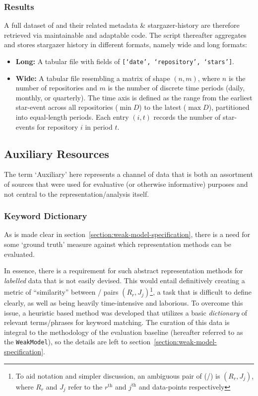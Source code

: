\subsubsection{Results}
A full dataset of \ghrepos{} and their related metadata \& stargazer-history are therefore retrieved via maintainable and adaptable code.
The script thereafter aggregates and stores stargazer history in different formats, namely wide and long formats:
\begin{itemize}
    \item \textbf{Long:} A tabular file with fields of \texttt{[`date', `repository', `stars']}.
    \item \textbf{Wide:} A tabular file resembling a matrix of shape $(n, m)$, where $n$ is the number of repositories and $m$ is the number of discrete time periods (daily, monthly, or quarterly).
          The time axis is defined as the range from the earliest star-event across all repositories ($\min D$) to the latest ($\max D$), partitioned into equal-length periods. Each entry $(i, t)$ records the number of star-events for repository $i$ in period $t$.
\end{itemize}

\subsection{Auxiliary Resources}
The term `Auxiliary' here represents a channel of data that is both an assortment of sources that were used for evaluative (or otherwise informative) purposes and not central to the representation/analysis itself.
\subsubsection{Keyword Dictionary}
As is made clear in section~\ref{section:weak-model-specification}, there is a need for some `ground truth' measure against which representation methods can be evaluated.

In essence, there is a requirement for such abstract representation methods for \emph{labelled} data that is not easily devised.
This would entail definitively creating a metric of ``similarity'' between \jobpost{}/\repo{} pairs $(R_r, J_j)$\footnote{To aid notation and simpler discussion, an ambiguous pair of (\jobpost{}/\repo{}) is $(R_r, J_j)$, where $R_r$ and $J_j$ refer to the $r^{\text{th}}$ and $j^{\text{th}}$ \repo{} and \jobpost{} data-points respectively},
a task that is difficult to define clearly, as well as being heavily time-intensive and laborious.
To overcome this issue, a heuristic based method was developed that utilizes a basic \emph{dictionary} of relevant terms/phrases for keyword matching.
The curation of this data is integral to the methodology of the evaluation baseline (hereafter referred to as the \texttt{WeakModel}), so the details are left to section~\ref{section:weak-model-specification}.

